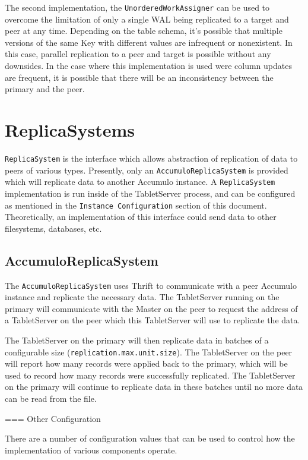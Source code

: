 The second implementation, the \texttt{UnorderedWorkAssigner} can be used to overcome the limitation
of only a single WAL being replicated to a target and peer at any time. Depending on the table schema,
it's possible that multiple versions of the same Key with different values are infrequent or nonexistent.
In this case, parallel replication to a peer and target is possible without any downsides. In the case
where this implementation is used were column updates are frequent, it is possible that there will be
an inconsistency between the primary and the peer.

\section{ReplicaSystems}

\texttt{ReplicaSystem} is the interface which allows abstraction of replication of data
to peers of various types. Presently, only an \texttt{AccumuloReplicaSystem} is provided
which will replicate data to another Accumulo instance. A \texttt{ReplicaSystem} implementation
is run inside of the TabletServer process, and can be configured as mentioned in the 
\texttt{Instance Configuration} section of this document. Theoretically, an implementation
of this interface could send data to other filesystems, databases, etc.

\subsection{ AccumuloReplicaSystem}

The \texttt{AccumuloReplicaSystem} uses Thrift to communicate with a peer Accumulo instance
and replicate the necessary data. The TabletServer running on the primary will communicate
with the Master on the peer to request the address of a TabletServer on the peer which
this TabletServer will use to replicate the data.

The TabletServer on the primary will then replicate data in batches of a configurable
size (\texttt{replication.max.unit.size}). The TabletServer on the peer will report how many
records were applied back to the primary, which will be used to record how many records
were successfully replicated. The TabletServer on the primary will continue to replicate
data in these batches until no more data can be read from the file.

=== Other Configuration

There are a number of configuration values that can be used to control how
the implementation of various components operate.

